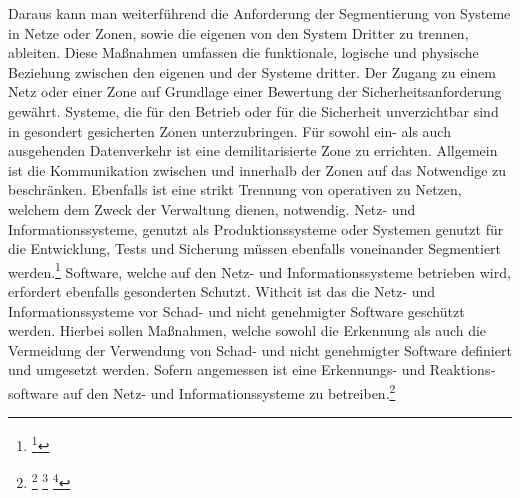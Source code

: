 \documentclass[11pt,a4paper,hidelinks]{article}   %
\begin{document}
            Daraus kann man weiterführend die Anforderung der Segmentierung von Systeme in Netze oder Zonen, sowie die eigenen von den System Dritter zu trennen, ableiten. Diese Maßnahmen umfassen die funktionale, logische und physische Beziehung zwischen den eigenen und der Systeme dritter. Der Zugang zu einem Netz oder einer Zone auf Grundlage einer Bewertung der Sicherheitsanforderung gewährt. Systeme, die für den Betrieb oder für die Sicherheit unverzichtbar sind in gesondert gesicherten Zonen unterzubringen. Für sowohl ein- als auch ausgehenden Datenverkehr ist eine demilitarisierte Zone zu errichten. Allgemein ist die Kommunikation zwischen und innerhalb der Zonen auf das Notwendige zu beschränken. Ebenfalls ist eine strikt Trennung von operativen zu Netzen, welchem dem Zweck der Verwaltung dienen, notwendig. Netz- und Informationssysteme, genutzt als Produktionssysteme oder Systemen genutzt für die Entwicklung, Tests und Sicherung müssen ebenfalls voneinander Segmentiert werden.\footnote{\footcite[Vgl.][, Anhang, Nummer 6.8.2.]{EU2024-2690}} Software, welche auf den Netz- und Informationssysteme betrieben wird, erfordert ebenfalls gesonderten Schutzt. Withcit ist das die Netz- und Informationssysteme vor Schad- und nicht genehmigter Software geschützt werden. Hierbei sollen Maßnahmen, welche sowohl die Erkennung als auch die Vermeidung der Verwendung von Schad- und nicht genehmigter Software definiert und umgesetzt werden. Sofern angemessen ist eine Erkennungs- und Reaktions­software auf den Netz- und Informationssysteme zu betreiben.\footnote{
                \footcite[Vgl.][, Anhang, Nummer 6.9.1. \& 6.9.2.]{EU2024-2690}
                \footcite[Vgl.][, §31 Absatz 2]{NIS2UmsuCG} %
                \footcite[Vgl.][, §53 Absatz 1]{NIS2UmsuCG} %
            }
            
\end{document}
